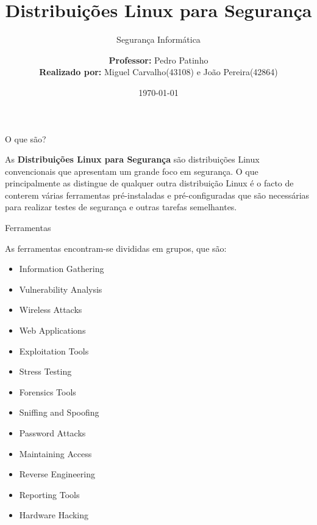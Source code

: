 \documentclass{beamer}
\title[Segurança Informática]
{\textbf{Distribuições Linux para Segurança}}
\subtitle{Segurança Informática}
\institute[UE]
\author[Miguel Carvalho, João Pereira]
{\textbf{Professor:} Pedro Patinho\\
\textbf{Realizado por:} Miguel Carvalho(43108) e João Pereira(42864)}
\date[2020-2021]
{\today}
\newcommand{\nologo}{\setbeamertemplate{logo}{}}
\begin{document}
\maketitle
\nologo
\begin{frame}{O que são?}

\justifying
As \textbf{Distribuições Linux para Segurança} são distribuições Linux convencionais que apresentam um grande foco em segurança. O que principalmente as distingue de qualquer outra distribuição Linux é o facto de conterem várias ferramentas pré-instaladas e pré-configuradas que são necessárias para realizar testes de segurança e outras tarefas semelhantes.  

\end{frame}
\begin{frame}{Ferramentas}

As ferramentas encontram-se divididas em grupos, que são:
\begin{itemize}
    \item Information Gathering
    \item Vulnerability Analysis
    \item Wireless Attacks
    \item Web Applications
    \item Exploitation Tools
    \item Stress Testing
    \item Forensics Tools
    \item Sniffing and Spoofing
    \item Password Attacks
    \item Maintaining Access
    \item Reverse Engineering
    \item Reporting Tools
    \item Hardware Hacking
\end{itemize}

\end{frame}
\end{document}
